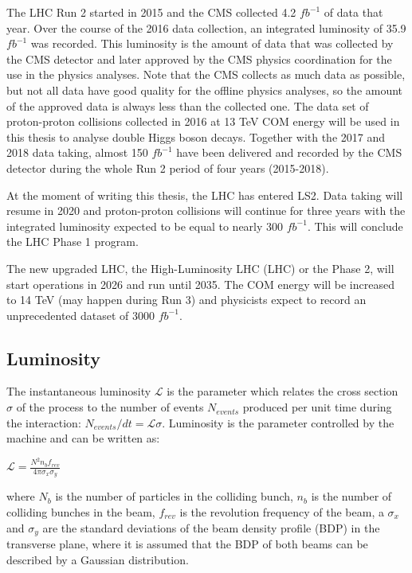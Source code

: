 \begin{normalsize}
The LHC Run 2 started in 2015 and the CMS collected 4.2 $fb^{-1}$ of data that year. Over the course of the 2016 data collection, an integrated luminosity of 35.9 $fb^{-1}$ was recorded. This luminosity is the amount of data that was collected by the CMS detector and later approved by the CMS physics coordination for the use in the physics analyses. Note that the CMS collects as much data as possible, but not all data have good quality for the offline physics analyses, so the amount of the approved data is always less than the collected one. The data set of proton-proton collisions collected in 2016 at 13 TeV COM energy will be used in this thesis to analyse double Higgs boson decays. Together with the 2017 and 2018 data taking, almost 150 $fb^{-1}$ have been delivered and recorded by the CMS detector during the whole Run 2 period of four years (2015-2018). 


At the moment of writing this thesis, the LHC has entered LS2. Data taking will resume in 2020 and proton-proton collisions will continue for three years with the integrated luminosity expected to be equal to nearly 300 $fb^{-1}$. This will conclude the LHC Phase 1 program. 




The new upgraded LHC, the High-Luminosity LHC (LHC) or the Phase 2, will start operations in 2026 and run until 2035. The COM energy will be increased to 14 TeV (may happen during Run 3) and physicists expect to record an unprecedented dataset of 3000 $fb^{-1}$. 

\subsection{Luminosity}
\label{sec:luminosity}


The instantaneous luminosity $ \mathcal{L} $ is the parameter which relates the cross section $\sigma$ of the process to the number of events $N_{events}$ produced per unit time during the interaction: $N_{events} / dt = \mathcal{L}  \sigma$. Luminosity is the parameter controlled by the machine and can be written as:

$ \mathcal{L} =\frac{N^2 n_b f_{rev}}{4\pi \sigma_x \sigma_y}$

\noindent where $N_b$ is the number of particles in the colliding bunch, $n_b$ is the number of colliding bunches in the beam, $f_{rev}$ is the revolution frequency of the beam, a $\sigma_x$ and $\sigma_y$ are the standard deviations of the beam density profile (BDP) in the transverse plane, where it is assumed that the BDP of both beams can be described by a Gaussian distribution.



\end{normalsize}
